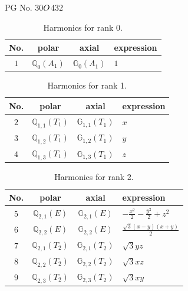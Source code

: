 \documentclass[fleqn,8pt,landscape]{jsarticle}
\begin{document}
\setcounter{MaxMatrixCols}{32}

\renewcommand{\tablename}{Table~}
\renewcommand{\figurename}{Figure~}
\begin{center}
\LARGE
PG No. 30\quad$O_{\rm }$\quad$432$\quad[ cubic ]
\end{center}
\begin{table}[ht!]
\begin{center}
\caption{Harmonics for rank 0.}
\renewcommand{\arraystretch}{1.3}
\begin{tabular}{cccl} \hline \hline
No. & polar & axial & expression \\ \hline
$ 1 $ & $ \mathbb{Q}_{0}(A_{1}) $ & $ \mathbb{G}_{0}(A_{1}) $ & $ 1 $ \\
 \hline \hline
\end{tabular}
\end{center}
\end{table}
\begin{table}[ht!]
\begin{center}
\caption{Harmonics for rank 1.}
\renewcommand{\arraystretch}{1.3}
\begin{tabular}{cccl} \hline \hline
No. & polar & axial & expression \\ \hline
$ 2 $ & $ \mathbb{Q}_{1,1}(T_{1}) $ & $ \mathbb{G}_{1,1}(T_{1}) $ & $ x $ \\
$ 3 $ & $ \mathbb{Q}_{1,2}(T_{1}) $ & $ \mathbb{G}_{1,2}(T_{1}) $ & $ y $ \\
$ 4 $ & $ \mathbb{Q}_{1,3}(T_{1}) $ & $ \mathbb{G}_{1,3}(T_{1}) $ & $ z $ \\
 \hline \hline
\end{tabular}
\end{center}
\end{table}
\begin{table}[ht!]
\begin{center}
\caption{Harmonics for rank 2.}
\renewcommand{\arraystretch}{1.3}
\begin{tabular}{cccl} \hline \hline
No. & polar & axial & expression \\ \hline
$ 5 $ & $ \mathbb{Q}_{2,1}(E) $ & $ \mathbb{G}_{2,1}(E) $ & $ - \frac{x^{2}}{2} - \frac{y^{2}}{2} + z^{2} $ \\
$ 6 $ & $ \mathbb{Q}_{2,2}(E) $ & $ \mathbb{G}_{2,2}(E) $ & $ \frac{\sqrt{3} \left(x - y\right) \left(x + y\right)}{2} $ \\
$ 7 $ & $ \mathbb{Q}_{2,1}(T_{2}) $ & $ \mathbb{G}_{2,1}(T_{2}) $ & $ \sqrt{3} y z $ \\
$ 8 $ & $ \mathbb{Q}_{2,2}(T_{2}) $ & $ \mathbb{G}_{2,2}(T_{2}) $ & $ \sqrt{3} x z $ \\
$ 9 $ & $ \mathbb{Q}_{2,3}(T_{2}) $ & $ \mathbb{G}_{2,3}(T_{2}) $ & $ \sqrt{3} x y $ \\
 \hline \hline
\end{tabular}
\end{center}
\end{table}
\end{document}
